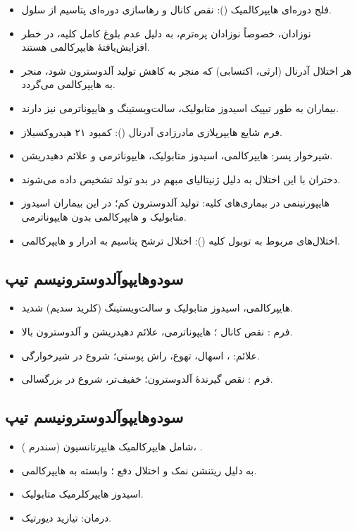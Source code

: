 \documentclass[11pt,a4paper]{article}
\begin{document}
\begin{itemize}
\item فلج دوره‌ای هایپرکالمیک (): نقص کانال  و رهاسازی دوره‌ای پتاسیم از سلول.
\item نوزادان، خصوصاً نوزادان پره‌ترم، به دلیل عدم بلوغ کامل کلیه، در خطر افزایش‌یافتهٔ هایپرکالمی هستند.
\item هر اختلال آدرنال (ارثی، اکتسابی) که منجر به کاهش تولید آلدوسترون شود، منجر به هایپرکالمی می‌گردد.
\item بیماران به طور تیپیک اسیدوز متابولیک، سالت‌ویستینگ و هایپوناترمی نیز دارند.
\item فرم شایع هایپرپلازی مادرزادی آدرنال (): کمبود ۲۱ هیدروکسیلاز.
\item شیرخوار پسر: هایپرکالمی، اسیدوز متابولیک، هایپوناترمی و علائم دهیدریشن.
\item دختران با این اختلال به دلیل ژنیتالیای مبهم در بدو تولد تشخیص داده می‌شوند.
\item هایپورنینمی در بیماری‌های کلیه: تولید آلدوسترون کم؛ در این بیماران اسیدوز متابولیک و هایپرکالمی بدون هایپوناترمی.
\item اختلال‌های مربوط به توبول کلیه (): اختلال ترشح پتاسیم به ادرار و هایپرکالمی.
\end{itemize}
\subsection*{سودوهایپوآلدوسترونیسم تیپ }
\begin{itemize}
\item هایپرکالمی، اسیدوز متابولیک و سالت‌ویستینگ (کلرید سدیم) شدید.
\item فرم : نقص کانال ؛ هایپوناترمی، علائم دهیدریشن و آلدوسترون بالا.
\item علائم: ، اسهال، تهوع، راش پوستی؛ شروع در شیرخوارگی.
\item فرم : نقص گیرندهٔ آلدوسترون؛ خفیف‌تر، شروع در بزرگسالی.
\end{itemize}
\subsection*{سودوهایپوآلدوسترونیسم تیپ }
\begin{itemize}
\item شامل هایپرکالمیک هایپرتانسیون (سندرم )، .
\item {} به دلیل ریتنشن نمک و اختلال دفع ؛ وابسته به هایپرکالمی.
\item اسیدوز هایپرکلرمیک متابولیک.
\item درمان: تیازید دیورتیک.
\end{itemize}
\end{document}

